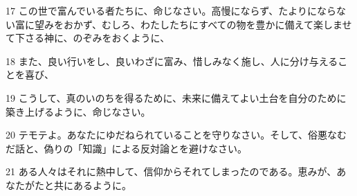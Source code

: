 \par 17 この世で富んでいる者たちに、命じなさい。高慢にならず、たよりにならない富に望みをおかず、むしろ、わたしたちにすべての物を豊かに備えて楽しませて下さる神に、のぞみをおくように、
\par 18 また、良い行いをし、良いわざに富み、惜しみなく施し、人に分け与えることを喜び、
\par 19 こうして、真のいのちを得るために、未来に備えてよい土台を自分のために築き上げるように、命じなさい。
\par 20 テモテよ。あなたにゆだねられていることを守りなさい。そして、俗悪なむだ話と、偽りの「知識」による反対論とを避けなさい。
\par 21 ある人々はそれに熱中して、信仰からそれてしまったのである。恵みが、あなたがたと共にあるように。


